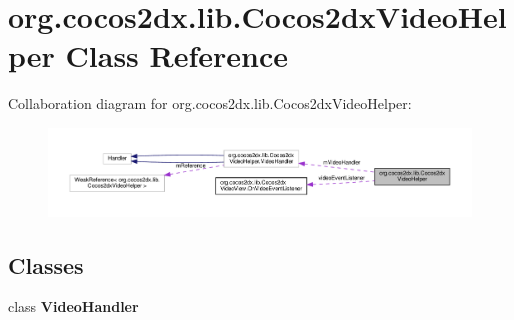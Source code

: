 \hypertarget{classorg_1_1cocos2dx_1_1lib_1_1Cocos2dxVideoHelper}{}\section{org.\+cocos2dx.\+lib.\+Cocos2dx\+Video\+Helper Class Reference}
\label{classorg_1_1cocos2dx_1_1lib_1_1Cocos2dxVideoHelper}


Collaboration diagram for org.\+cocos2dx.\+lib.\+Cocos2dx\+Video\+Helper\+:
\nopagebreak
\begin{figure}[H]
\begin{center}
\leavevmode
\includegraphics[width=350pt]{classorg_1_1cocos2dx_1_1lib_1_1Cocos2dxVideoHelper__coll__graph}
\end{center}
\end{figure}
\subsection*{Classes}
\begin{DoxyCompactItemize}
\item 
class {\bfseries Video\+Handler}
\end{DoxyCompactItemize}
